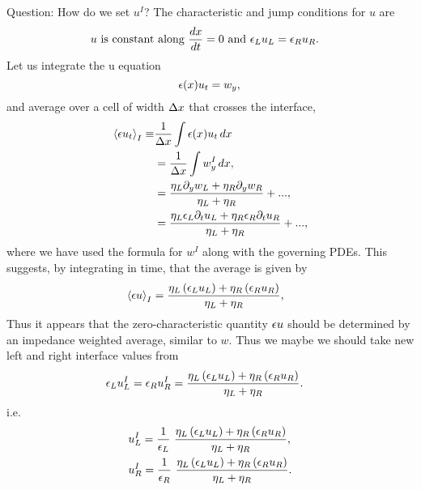 \medskip
Question: How do we set $u^I$? 
The characteristic and jump conditions for $u$ are
\begin{align*}
 &  \text{$u$ is constant along $\frac{dx}{dt}=0$ and $\epsilon_L u_L = \epsilon_R u_R$}. 
\end{align*}
Let us integrate the u equation 
\[
  \epsilon(x) u_t = w_y , \\
\]
and average over a cell of width $\Delta x$ that crosses the interface, 
\begin{align*}
   \left<\epsilon u_t\right>_I \equiv & \frac{1}{\Delta x} \int \epsilon(x) u_t \, dx \\
       & = \frac{1}{\Delta x}\int  w^I_y \, dx , \\
       & = \frac{ \eta_L \partial_y w_L + \eta_R \partial_y w_R}{\eta_L + \eta_R} + ... , \\
       & = \frac{ \eta_L \epsilon_L \partial_t u_L + \eta_R \epsilon_R\partial_t u_R}{\eta_L + \eta_R} + ... , \\
\end{align*}
where we have used the formula for $w^I$ along with the governing PDEs. This 
suggests, by integrating in time, that the average is given by 
\begin{align*}
 &  \left<\epsilon u\right>_I = \frac{ \eta_L\, (\epsilon_L u_L) + \eta_R\, (\epsilon_R u_R)}{\eta_L + \eta_R} ,
\end{align*}
Thus it appears that the zero-characteristic quantity $\epsilon u$ should be determined by an impedance weighted average,
similar to $w$. 
Thus we maybe we should take new left and right interface values from 
\begin{align*}
 &  \epsilon_L u_L^I = \epsilon_R u_R^I =  \frac{ \eta_L\, (\epsilon_L u_L) + \eta_R\, (\epsilon_R u_R)}{\eta_L + \eta_R} . 
\end{align*}
i.e.
\begin{align*}
 &   u_L^I = \frac{1}{\epsilon_L} ~  \frac{ \eta_L\, (\epsilon_L u_L) + \eta_R\, (\epsilon_R u_R)}{\eta_L + \eta_R} , \\
 &   u_R^I = \frac{1}{\epsilon_R} ~  \frac{ \eta_L\, (\epsilon_L u_L) + \eta_R\, (\epsilon_R u_R)}{\eta_L + \eta_R} . 
\end{align*}
